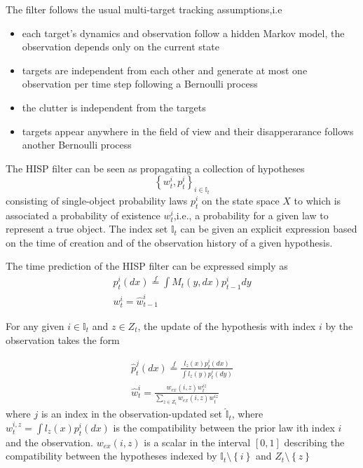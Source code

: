 \documentclass[a4paper, 11pt]{article}
\begin{document}
\begin{CJK}{UTF8}{gbsn}
The filter follows the usual multi-target tracking assumptions,i.e
\begin{itemize}
\item each target's dynamics and observation follow a hidden Markov model, the observation depends only on the current state
\item targets are independent from each other and generate at most one observation per time step following a Bernoulli process
\item the clutter is independent from the targets
\item targets appear anywhere in the field of view and their disapperarance follows another Bernoulli process
\end{itemize}

The HISP filter can be seen as propagating a collection of hypotheses
\begin{equation}
\left\{w_t^i,p_t^i \right\}_{i \in \mathbb{I}_t}
\end{equation}
consisting of single-object probability laws $p_t^i$ on the state space $X$ to which is associated a probability of existence $w_t^i$,i.e., a probability for a given law to represent a true object. The index set $\mathbb{I}_t$ can be given an explicit expression based on the  time of creation and of the observation history of a given hypothesis.

The time prediction of the HISP filter can be expressed simply as
\begin{equation}
\begin{aligned}
p_t^i(dx)\overset{f}{=} \int M_t(y,dx)p_{t-1}^i dy\\
w_t^i = \hat{w}_{t-1}^i
\end{aligned}
\end{equation}

For any given $i \in \mathbb{I}_t$ and $z \in Z_t$, the update of the hypothesis with index $i$ by the observation takes the form

\begin{equation}
\begin{aligned}
\hat{p}_t^j(dx) \overset{f}{=}  \frac{l_z(x)p_t^i(dx)}{\int l_z(y)p_t^i(dy)}\\
\hat{w}_t^i =  \frac{w_{ex}(i,z)w_t^{iz}}{\sum_{z \in Z_t} w_{ex}(i,z)w_t^{iz}}
\end{aligned}
\end{equation}
where $j$ is an index in the observation-updated set $\hat{\mathbb{I}}_t$, where $w_t^{i,z} = \int l_z(x)p_t^i(dx)$ is the compatibility between the prior law ith index $i$ and the observation. $w_{ex}(i,z)$ is a scalar in the interval $[0,1]$ describing the compatibility between the hypotheses indexed by $\mathbb{I}_t \setminus \left\{i\right\}$ and $Z_t \setminus \left\{ z\right\}$


\end{CJK}
\end{document}
